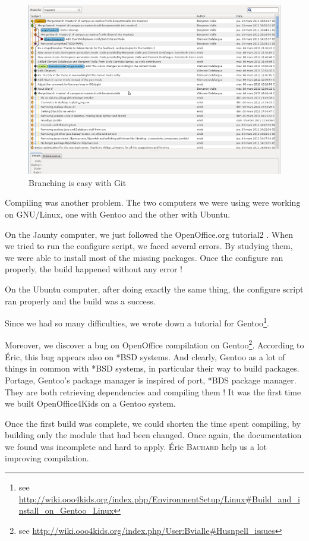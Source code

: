 \documentclass[a4paper,11pt]{article}
\begin{document}
\begin{figure}[!h]
\centering
\includegraphics[scale=0.3]{images/Gitg.png}
\caption{Branching is easy with Git}
\end{figure}   
   
Compiling was another problem. The two computers we were using were working on GNU/Linux, one with Gentoo and the other with Ubuntu.

On the Jaunty computer, we just followed the OpenOffice.org tutorial2 . When we tried to run the configure script, we faced several errors. By studying them, we were able to install most of the missing packages. Once the configure ran properly, the build happened without any error !

On the Ubuntu computer, after doing exactly the same thing, the configure script ran properly and the build was a success.

Since we had so many difficulties, we wrote down a tutorial for Gentoo\footnote{see \url{http://wiki.ooo4kids.org/index.php/EnvironmentSetup/Linux\#Build\_and\_install\_on\_Gentoo_Linux}}.

Moreover, we discover a bug on OpenOffice compilation on Gentoo\footnote{see \url{http://wiki.ooo4kids.org/index.php/User:Bvialle\#Husnpell\_issues}}. According to Éric, this bug appears also on *BSD systems. And clearly, Gentoo as a lot of things in common with *BSD systems, in particular their way to build packages. Portage, Gentoo's package manager is inspired of port, *BDS package manager. They are both retrieving dependencies and compiling them ! It was the first time we built OpenOffice4Kids on a Gentoo system.

Once the first build was complete, we could shorten the time spent compiling, by building only the module that had been changed. Once again, the documentation we found was incomplete and hard to apply. Éric \textsc{Bachard} help us a lot improving compilation.
\end{document}
